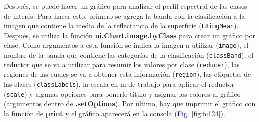 \documentclass[
  12pt,
  letterpaper,
  twoside]{book}
\newcommand\boldpurple[1]{\textcolor{darkpurple}{\textbf{#1}}}
\begin{document}
Después, se puede hacer un gráfico para analizar el perfil espectral de las clases de interés. Para hacer esto, primero se agrega la banda con la clasificación a la imagen que contiene la media de la reflectancia de la superficie (\texttt{L8imgMean}). Después, se utiliza la función \boldpurple{ui.Chart.image.byClass} para crear un gráfico por clase. Como argumentos a esta función se indica la imagen a utilizar (\texttt{image}), el nombre de la banda que contiene las categorías de la clasificación (\texttt{classBand}), el reductor que se va a utilizar para resumir los valores por clase (\texttt{reducer}), las regiones de las cuales se va a obtener esta información (\texttt{region}), las etiquetas de las clases (\texttt{classLabels}), la escala en m de trabajo para aplicar el reductor (\texttt{scale}) y algunas opciones para ponerle título y asignar los colores al gráfico (argumentos dentro de \boldpurple{.setOptions}). Por último, hay que imprimir el gráfico con la función de \boldpurple{print} y el gráfico aparecerá en la consola (\textcolor{darkblue}{Fig.} \ref{fig:fc124}).
\end{document}
